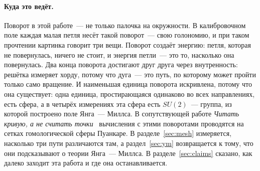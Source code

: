 \paragraph{Куда это ведёт.} Поворот в этой работе~--- не только палочка на окружности. В
калибровочном поле каждая малая петля несёт такой поворот~--- свою голономию, и при таком прочтении картинка
говорит три вещи. Поворот создаёт энергию: петля, которая не повернулась, ничего не стоит,
и энергия петли~--- это то, насколько она повернулась. Два конца поворота достигают друг друга
через внутренность: решётка измеряет хорду, потому что дуга~--- это путь, по которому может пройти
только само вращение. И наименьшая единица поворота искривлена, потому что она существует:
одна единица, простирающаяся одинаково во всех направлениях, есть сфера, а в четырёх измерениях эта
сфера есть $SU(2)$~--- группа, из которой построено поле Янга~--- Миллса. В сопутствующей работе
\emph{Читать кривую, а не считать точки}~\cite{davis-rtc} вычисления с этими поворотами проводятся
на сетках гомологической сферы Пуанкаре. В разделе~\ref{sec:mesh} измеряется, насколько
три пути различаются там, а раздел~\ref{sec:ym} возвращается к тому, что они подсказывают о
теории Янга~--- Миллса. В разделе~\ref{sec:claims} сказано, как далеко заходит эта работа и где она останавливается.

